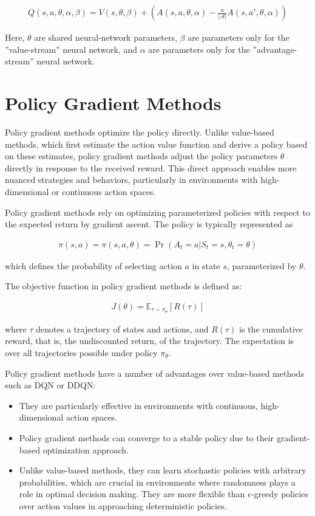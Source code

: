 \begin{align*}
Q(s, a, \theta, \alpha, \beta) = V(s, \theta, \beta) + \left( A(s, a, \theta, \alpha) - \frac{a}{|\mathcal{A}|} A(s, a', \theta, \alpha) \right)
\end{align*}

Here, $\theta$ are shared neural-network parameters, $\beta$ are parameters only for the ''value-stream'' neural network, and $\alpha$ are parameters only for the ''advantage-stream'' neural network.

\section{Policy Gradient Methods}

Policy gradient methods optimize the policy directly. Unlike value-based methods, which first estimate the action value function and derive a policy based on these estimates, policy gradient methods adjust the policy parameters $\theta$ directly in response to the received reward. This direct approach enables more nuanced strategies and behaviors, particularly in environments with high-dimensional or continuous action spaces.

Policy gradient methods rely on optimizing parameterized policies with respect to the expected return by gradient ascent. The policy is typically represented as 

\begin{align*}
\pi(s, a) = \pi(s, a, \theta) = \Pr(A_t = a | S_t = s, \theta_t = \theta)
\end{align*}

which defines the probability of selecting action $a$ in state $s$, parameterized by $\theta$. 

The objective function in policy gradient methods is defined as:

\begin{align}
J(\theta) = \mathbb{E}_{\tau \sim \pi_\theta} \left[ R(\tau) \right] \label{eq:policyobjective}
\end{align}

where $\tau$ denotes a trajectory of states and actions, and $R(\tau)$ is the cumulative reward, that is, the undiscounted return, of the trajectory. The expectation is over all trajectories possible under policy $\pi_\theta$.

Policy gradient methods have a number of advantages over value-based methods such as DQN or DDQN:
\begin{itemize}
\item They are particularly effective in environments with continuous, high-dimensional action spaces.
\item Policy gradient methods can converge to a stable policy due to their gradient-based optimization approach.
\item Unlike value-based methods, they can learn stochastic policies with arbitrary probabilities, which are crucial in environments where randomness plays a role in optimal decision making. They are more flexible than $\epsilon$-greedy policies over action values in approaching deterministic policies.
\end{itemize}

